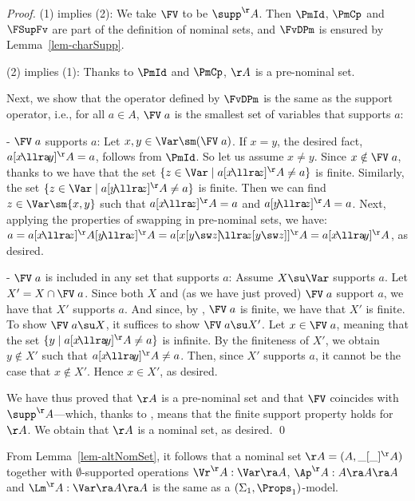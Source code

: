 \begin{proof}
(1)	 implies (2): We take $\FV$ to be $\supp^\AA$. Then $\PmId$, $\PmCp$ and $\FSupFv$ are part of the definition of nominal sets, and $\FvDPm$ is ensured by Lemma~\ref{lem-charSupp}. 

(2) implies (1): Thanks to $\PmId$ and $\PmCp$,  $\AA$  is a pre-nominal set. 

Next, we show that  the operator defined by $\FvDPm$ is the same as the support operator, i.e., for all $a\in A$, $\FV\;a$ is the smallest set of variables that supports $a$: 
\begin{description}
	\item{- $\FV\;a$ supports $a$:}  Let $x,y\in\Var \sm (\FV\;a)$.  
	If $x=y$, the desired fact, $a[x \!\llra\! y]^\AA = a$, follows from $\PmId$. So let us assume $x\not=y$. 
	Since $x\notin \FV\;a$, thanks to \FvDPm{} we have that the set $\{z\in\Var \mid a [x \!\llra\! z]^\AA \not= a\}$ is finite. Similarly, the set $\{z\in\Var \mid a [y \!\llra\! z]^\AA \not= a\}$ is finite. Then we can find $z\in \Var \sm \{x,y\}$ such that 
	$a [x \!\llra\! z]^\AA = a$ and $a [y \!\llra\! z]^\AA = a$. 
	Next, applying the properties of swapping in pre-nominal sets, we have:
	$a = a [x \!\llra\! z]^\AA [y \!\llra\! z]^\AA = 
	  a [x[y \sw z] \!\llra\! z[y\sw z]]^\AA = a [x \!\llra\! y]^\AA$, as desired.
	 \item{- $\FV\;a$ is included in any set that supports $a$:} 
	 Assume $X \su \Var$ supports $a$.  Let $X' = X \cap \FV\;a$. Since both $X$ and (as we have just proved) $\FV\;a$ support $a$, we have that $X'$ supports $a$. And since,  
	 by \FSupFv{}, $\FV\;a$ is finite, we have that $X'$ is finite. 
	 To show $\FV\;a \su X$, it suffices to show $\FV\;a \su X'$. 
	 Let $x\in \FV\;a$, meaning that the set $\{y \mid a[x \!\llra\! y]^\AA \not= a\}$ is infinite. By the finiteness of $X'$, we obtain $y\notin X'$ such that $a[x \!\llra\! y]^\AA \not= a$. Then, since $X'$ supports $a$, it cannot be the case that $x\notin X'$. Hence $x \in X'$, as desired.   	
\end{description}
%
We have thus proved that $\AA$ is a pre-nominal set and that 
$\FV$ coincides with $\supp^\AA$---which, thanks to \FSupFv{}, means that the finite support property holds for $\AA$.  We obtain that $\AA$ is a nominal set, as desired. \qed 
\end{proof}
\medskip 

From Lemma~\ref{lem-altNomSet}, it follows 
that 
a nominal set $\AA = (A,\_[\_]^\AA)$ together with $\emptyset$-supported operations 
$\Vr^\AA : \Var \ra A$, 
$\Ap^\AA : A \ra A \ra A$ and 
$\Lm^\AA : \Var \ra A \ra A$ is the same as a $(\Sigma_1,\Props_1)$-model.

